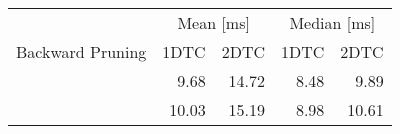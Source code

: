 \begin{tabular}{crrrr}
	\toprule
	                 & \multicolumn{2}{c}{Mean [\si{\milli\second}]} & \multicolumn{2}{c}{Median [\si{\milli\second}]}               \\
	Backward Pruning & 1DTC                                          & 2DTC                                            & 1DTC & 2DTC \\
	\midrule
	\xmark           & 9.68                                             & 14.72                                               & 8.48    & 9.89    \\
	\cmark           & 10.03                                             & 15.19                                               & 8.98    & 10.61    \\
	\bottomrule
\end{tabular}
